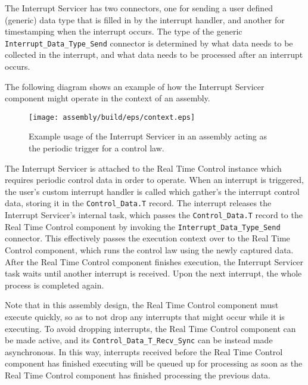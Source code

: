 The Interrupt Servicer has two connectors, one for sending a user defined (generic) data type that is filled in by the interrupt handler, and another for timestamping when the interrupt occurs. The type of the generic \texttt{Interrupt\_Data\_Type\_Send} connector is determined by what data needs to be collected in the interrupt, and what data needs to be processed after an interrupt occurs. 

The following diagram shows an example of how the Interrupt Servicer component might operate in the context of an assembly.

\begin{figure}[H]
  \texttt{[image: assembly/build/eps/context.eps]}
  \caption{Example usage of the Interrupt Servicer in an assembly acting as the periodic trigger for a control law.}
\end{figure}

The Interrupt Servicer is attached to the Real Time Control instance which requires periodic control data in order to operate. When an interrupt is triggered, the user's custom interrupt handler is called which gather's the interrupt control data, storing it in the \texttt{Control\_Data.T} record. The interrupt releases the Interrupt Servicer's internal task, which passes the \texttt{Control\_Data.T} record to the Real Time Control component by invoking the \texttt{Interrupt\_Data\_Type\_Send} connector. This effectively passes the execution context over to the Real Time Control component, which runs the control law using the newly captured data. After the Real Time Control component finishes execution, the Interrupt Servicer task waits until another interrupt is received. Upon the next interrupt, the whole process is completed again. 

Note that in this assembly design, the Real Time Control component must execute quickly, so as to not drop any interrupts that might occur while it is executing. To avoid dropping interrupts, the Real Time Control component can be made active, and its \texttt{Control\_Data\_T\_Recv\_Sync} can be instead made asynchronous. In this way, interrupts received before the Real Time Control component has finished executing will be queued up for processing as soon as the Real Time Control component has finished processing the previous data.
